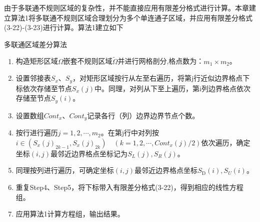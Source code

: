 \documentclass[twoside,UTF8]{nputhesis}
\begin{document}
\clearpage
由于多联通不规则区域的复杂性，并不能直接应用有限差分格式进行计算。本章建立算法1将多联通不规则区域合理划分为多个单连通子区域，并应用有限差分格式(3-22)-(3-23)进行计算。算法1建立如下
\begin{algorithm}
	\caption{多联通区域差分算法}      %
	\begin{enumerate}[Step 1:]
		\item  构造矩形区域$\Omega $嵌套不规则区域$\tilde{\Omega }$并进行网格剖分,格点数为：${{m}_{1}}\times {{m}_{2}}$。
		\item
		设置邻接表${{S}_{x}}$、${{S}_{y}}$，对矩形区域按行从左至右遍历，将第j行近似边界格点下标依次存储至节点${{S}_{x}}(j)$中。同理，对列从下至上遍历，第i列边界格点依次存储至节点${{S}_{y}}(i)$。
		\item
		设置数组$Con{{t}_{x}}$、$Con{{t}_{y}}$记录各行（列）边界边界节点个数。
		\item
		按行进行遍历$j=1,2,\cdots ,{{m}_{2}}$。在第j行中对列按$i\in ({{S}_{x}}{{(j)}_{2k-1}},{{S}_{x}}{{(j)}_{2k}})\quad (k=1,2,\cdots ,Con{{t}_{x}}(j)/2)$依次遍历，确定坐标$(i,j)$最邻近边界格点坐标记为${{S}_{L}}(j),{{S}_{R}}(j)$。
		\item 	 同理按列进行遍历，可确定坐标$(i,j)$最邻近边界格点坐标${{S}_{\text{D}}}(i),{{S}_{U}}(i)$。
		\item 重复Step4、Step5，将下标带入有限差分格式(3-22)，得到相应的线性方程组。
		\item 应用算法1计算方程组，输出结果。
	\end{enumerate}		
\end{algorithm}
\end{document}
